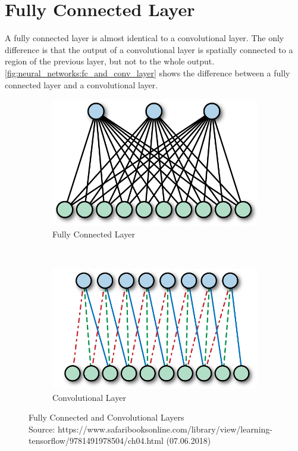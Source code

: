 \section{Fully Connected Layer}
A fully connected layer is almost identical to a convolutional layer. The only difference is that the output of a convolutional layer is spatially connected to a region of the previous layer, but not to the whole output. \autoref{fig:neural_networks:fc_and_conv_layer} shows the difference between a fully connected layer and a convolutional layer.

\begin{figure}[H]
    \centering
	\begin{subfigure}{0.4\textwidth}
    	\includegraphics[width=0.9\linewidth]{chapters/neural_networks/images/fc_layer.png}		    \caption{Fully Connected Layer}
    	\label{fig:challenges:max_pooling}
	\end{subfigure}~
	\begin{subfigure}{0.4\textwidth}
    	\includegraphics[width=0.9\linewidth]{chapters/neural_networks/images/conv_layer.png}       	\caption{Convolutional Layer}
    	\label{fig:challenges:avg_pooling}
	\end{subfigure}
	\caption{Fully Connected and Convolutional Layers\\Source: https://www.safaribooksonline.com/library/view/learning-tensorflow/9781491978504/ch04.html (07.06.2018)}
	\label{fig:neural_networks:fc_and_conv_layer}
\end{figure}

